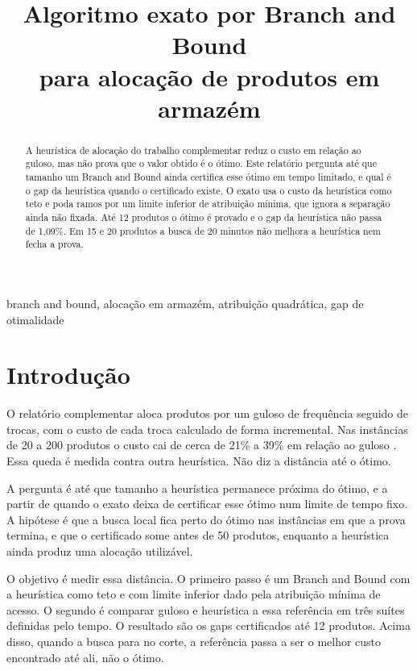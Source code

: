 \documentclass[conference,a4paper]{IEEEtran}
\begin{document}
\title{Algoritmo exato por Branch and Bound\\
para alocação de produtos em armazém}

\author{
}

\maketitle

\begin{abstract}
A heurística de alocação do trabalho complementar reduz o custo em relação ao guloso, mas não prova que o valor obtido é o ótimo.
Este relatório pergunta até que tamanho um Branch and Bound ainda certifica esse ótimo em tempo limitado, e qual é o gap da heurística quando o certificado existe.
O exato usa o custo da heurística como teto e poda ramos por um limite inferior de atribuição mínima, que ignora a separação ainda não fixada.
Até 12 produtos o ótimo é provado e o gap da heurística não passa de 1,09\%.
Em 15 e 20 produtos a busca de 20 minutos não melhora a heurística nem fecha a prova.
\end{abstract}

\begin{IEEEkeywords}
branch and bound, alocação em armazém, atribuição quadrática, gap de otimalidade
\end{IEEEkeywords}

\section{Introdução}
O relatório complementar aloca produtos por um guloso de frequência seguido de trocas, com o custo de cada troca calculado de forma incremental.
Nas instâncias de 20 a 200 produtos o custo cai de cerca de 21\% a 39\% em relação ao guloso \cite{kim2020,wutthisirisart2015,chou2023}.
Essa queda é medida contra outra heurística.
Não diz a distância até o ótimo.

A pergunta é até que tamanho a heurística permanece próxima do ótimo, e a partir de quando o exato deixa de certificar esse ótimo num limite de tempo fixo.
A hipótese é que a busca local fica perto do ótimo nas instâncias em que a prova termina, e que o certificado some antes de 50 produtos, enquanto a heurística ainda produz uma alocação utilizável.

O objetivo é medir essa distância.
O primeiro passo é um Branch and Bound com a heurística como teto e com limite inferior dado pela atribuição mínima de acesso.
O segundo é comparar guloso e heurística a essa referência em três suítes definidas pelo tempo.
O resultado são os gaps certificados até 12 produtos.
Acima disso, quando a busca para no corte, a referência passa a ser o melhor custo encontrado até ali, não o ótimo.
\end{document}
